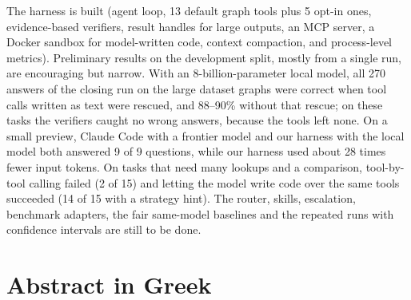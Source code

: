 \documentclass[12pt,a4paper]{report}
\begin{document}
The harness is built (agent loop, 13 default graph tools plus 5 opt-in ones, evidence-based verifiers, result handles
for large outputs, an MCP server, a Docker sandbox for model-written code, context compaction, and process-level
metrics). Preliminary results on the development split, mostly from a single run, are encouraging but narrow. With an
8-billion-parameter local model, all 270 answers of the closing run on the large dataset graphs were correct when tool
calls written as text were rescued, and 88--90\% without that rescue; on these tasks the verifiers caught no wrong
answers, because the tools left none. On a small preview, Claude Code with a frontier model and our harness with the
local model both answered 9 of 9 questions, while our harness used about 28 times fewer input tokens. On tasks that
need many lookups and a comparison, tool-by-tool calling failed (2 of 15) and letting the model write code over the
same tools succeeded (14 of 15 with a strategy hint). The router, skills, escalation, benchmark adapters, the fair
same-model baselines and the repeated runs with confidence intervals are still to be done.

\chapter*{Abstract in Greek}

\tableofcontents
\listoffigures
\listoftables
{}

\clearpage
{}











\appendix





\end{document}
